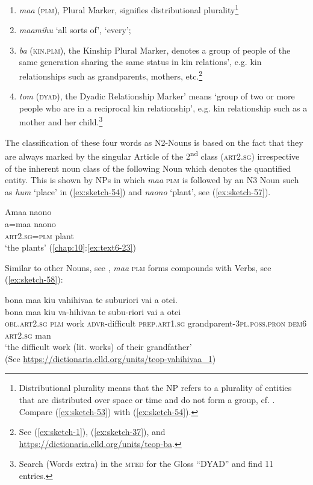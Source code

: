 \documentclass[output=paper]{langscibook}
\begin{document}
\largerpage
\begin{enumerate}
    \item \textit{maa} (\textsc{plm}), Plural Marker, signifies distributional plurality\footnote{Distributional plurality means that the NP refers to a plurality of entities that are distributed over space or time and do not form a group, cf. \textcite[11--117]{Corbett:2000gy}. Compare (\ref{ex:sketch-53}) with (\ref{ex:sketch-54}).}
    \item \textit{maamihu} `all sorts of', `every';
    \item \textit{ba} (\textsc{kin}.\textsc{plm}), the Kinship Plural Marker, denotes a group of people of the same generation sharing the same status in kin relations', e.g. kin relationships such as grandparents, mothers, etc.\footnote{See (\ref{ex:sketch-1}), (\ref{ex:sketch-37}), and \url{https://dictionaria.clld.org/units/teop-ba}.}
    \item \textit{tom} (\textsc{dyad}), the Dyadic Relationship Marker' means `group of two or more people who are in a reciprocal kin relationship', e.g. kin relationship such as a mother and her child.\footnote{Search (Words extra) in the \textsc{mted} for the Gloss ``DYAD'' and find 11 entries.} 
\end{enumerate}

The classification of these four words as N2-Nouns is based on the fact that they are always marked by the singular Article of the 2\textsuperscript{nd} class (\textsc{art}2.\textsc{sg}) irrespective of the inherent noun class of the following Noun which denotes the quantified entity. This is shown by NPs in which \textit{maa} \textsc{plm} is followed by an N3 Noun such as \textit{hum} `place' in (\ref{ex:sketch-54}) and \textit{naono} `plant', see (\ref{ex:sketch-57}).

\ea\label{ex:sketch-57}
    Amaa naono\\
    \gll a=maa	naono\\
    \textsc{art}2.\textsc{sg}=\textsc{plm}	plant\\
    \glt `the plants' (\ref{chap:10}:\ref{ex:text6-23})
\z

Similar to other Nouns, see , \textit{maa} \textsc{plm} forms compounds with Verbs, see (\ref{ex:sketch-58}):

\ea\label{ex:sketch-58}
    bona maa kiu vahihivaa te suburiori vai a otei.\\
    \gll bona maa kiu va-hihivaa te subu-riori vai a otei\\
    \textsc{obl}.\textsc{art}2.\textsc{sg} \textsc{plm} work \textsc{advr}-difficult \textsc{prep}.\textsc{art}1.\textsc{sg} grandparent-3\textsc{pl}.\textsc{poss}.\textsc{pron} \textsc{dem}6 \textsc{art}2.\textsc{sg} man\\
    \glt `the difficult work (lit. works) of their grandfather'\\\hfill (See \url{https://dictionaria.clld.org/units/teop-vahihivaa\_1})
\z
\end{document}
